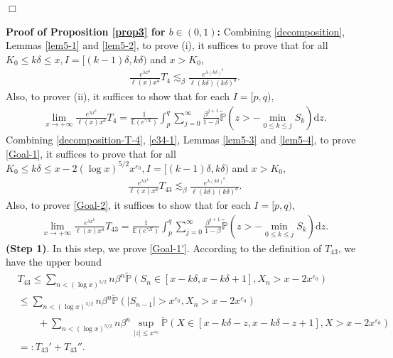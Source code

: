 \documentclass[11pt]{article}
\numberwithin{equation}{section}
\begin{document}
\hfill$\Box$


\noindent
\textbf{Proof of Proposition \ref{prop3} for $b\in (0,1)$:}
Combining \eqref{decomposition}, Lemmas \ref{lem5-1} and \ref{lem5-2}, to prove (i), it suffices to prove that for all $K_0\leq k\delta \leq x, I= [(k-1)\delta, k\delta)$ and $x>K_0$,
\begin{align}\label{Goal-1}
	\frac{ e^{\lambda x^b}}{\ell(x)x^a} T_4\lesssim_\beta \frac{e^{\lambda (k\delta)^b}}{\ell(k\delta) (k\delta)^a}.
\end{align}
Also, to prover (ii), it suffices to show that for each $I=[p,q)$,
\begin{align}\label{Goal-2}
	\lim_{x\to+\infty} \frac{ e^{\lambda x^b}}{\ell(x)x^a} T_4 = \frac{1}{\mathbb{E}(e^{\gamma X})} \int_p^q \sum_{j=0}^\infty \frac{\beta^{j+1}}{1-\beta} \widetilde{\mathbb{P}}\left(z> -\min_{0\leq k\leq j} S_k \right)\mathrm{d} z. 
\end{align}
Combining \eqref{decomposition-T-4}, \eqref{e34-1}, Lemmas \ref{lem5-3} and \ref{lem5-4}, to prove \eqref{Goal-1}, it suffices to prove that for all 
$K_0\leq k\delta \leq x-2(\log x)^{5/2}x^{\varepsilon_0}, I= [(k-1)\delta, k\delta)$ and $x>K_0$,
\begin{align}\label{Goal-1'}
	\frac{ e^{\lambda x^b}}{\ell(x)x^a} T_{43}\lesssim_\beta  \frac{e^{\lambda (k\delta)^b}}{\ell(k\delta) (k\delta)^a}.
\end{align}
Also, to prover \eqref{Goal-2}, it suffices to show that for each $I=[p,q)$,
\begin{align}\label{Goal-2'}
	\lim_{x\to+\infty} \frac{ e^{\lambda x^b}}{\ell(x)x^a} T_{43} = \frac{1}{\mathbb{E}(e^{\gamma X})}  \int_p^q \sum_{j=0}^\infty \frac{\beta^{j+1}}{1-\beta} \widetilde{\mathbb{P}}\left(z> -\min_{0\leq k\leq j} S_k \right)\mathrm{d} z. 
\end{align}
{\bf(Step 1)}. In this step, we prove \eqref{Goal-1'}.  
According to the definition of $T_{43}$, we have the upper bound 
\begin{align}\label{decomposition-T-43}
	&T_{43}\leq \sum_{n< (\log x)^{5/2}}  n\beta^{n}  \widetilde{\mathbb{P}}\left(S_n\in [x-k\delta, x-k\delta+1],  X_n > x-2x^{\varepsilon_0}\right)\nonumber\\
	&\leq \sum_{n< (\log x)^{5/2}}  n\beta^{n}  \widetilde{\mathbb{P}}\left( |S_{n-1}|>x^{\varepsilon_0},  X_n > x-2x^{\varepsilon_0}\right) \nonumber\\
	&\qquad +\sum_{n< (\log x)^{5/2}}  n\beta^{n}  \sup_{|z|\leq x^{\varepsilon_0}} \widetilde{\mathbb{P}}\left( X\in[x-k\delta-z, x-k\delta-z+1],  X > x-2x^{\varepsilon_0}\right)\nonumber\\
	&=: T_{43}'+T_{43}''.
\end{align}
\end{document}
